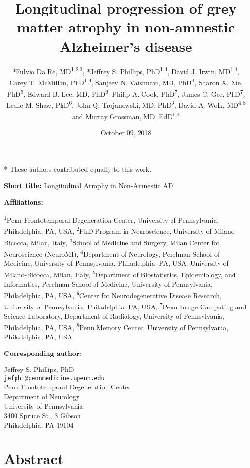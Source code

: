 \documentclass[]{article}
\title{Longitudinal progression of grey matter atrophy in non-amnestic
Alzheimer's disease}
\author{*Fulvio Da Re, MD\textsuperscript{1,2,3}, *Jeffrey S. Phillips,
PhD\textsuperscript{1,4}, David J. Irwin, MD\textsuperscript{1,4}, Corey
T. McMillan, PhD\textsuperscript{1,4}, Sanjeev N. Vaishnavi, MD,
PhD\textsuperscript{4}, Sharon X. Xie, PhD\textsuperscript{5}, Edward B.
Lee, MD, PhD\textsuperscript{6}, Philip A. Cook, PhD\textsuperscript{7},
James C. Gee, PhD\textsuperscript{7}, Leslie M. Shaw,
PhD\textsuperscript{6}, John Q. Trojanowski, MD, PhD\textsuperscript{6},
David A. Wolk, MD\textsuperscript{4,8} and Murray Grossman, MD,
EdD\textsuperscript{1,4}}
\date{October 09, 2018}
\begin{document}
\maketitle


* These authors contributed equally to this work.

\textbf{Short title:} Longitudinal Atrophy in Non-Amnestic AD

\textbf{Affiliations:}

\textsuperscript{1}Penn Frontotemporal Degeneration Center, University
of Pennsylvania, Philadelphia, PA, USA, \textsuperscript{2}PhD Program
in Neuroscience, University of Milano-Bicocca, Milan, Italy,
\textsuperscript{3}School of Medicine and Surgery, Milan Center for
Neuroscience (NeuroMI), \textsuperscript{4}Department of Neurology,
Perelman School of Medicine, University of Pennsylvania, Philadelphia,
PA, USA, University of Milano-Bicocca, Milan, Italy,
\textsuperscript{5}Department of Biostatistics, Epidemiology, and
Informatics, Perelman School of Medicine, University of Pennsylvania,
Philadelphia, PA, USA, \textsuperscript{6}Center for Neurodegenerative
Disease Research, University of Pennsylvania, Philadelphia, PA, USA,
\textsuperscript{7}Penn Image Computing and Science Laboratory,
Department of Radiology, University of Pennsylvania, Philadelphia, PA,
USA, \textsuperscript{8}Penn Memory Center, University of Pennsylvania,
Philadelphia, PA, USA

\textbf{Corresponding author:}

Jeffrey S. Phillips, PhD\\
\href{mailto:jefphi@pennmedicine.upenn.edu}{\nolinkurl{jefphi@pennmedicine.upenn.edu}}\\
Penn Frontotemporal Degeneration Center\\
Department of Neurology\\
University of Pennsylvania\\
3400 Spruce St., 3 Gibson\\
Philadelphia, PA 19104

\newpage


\section*{Abstract}\label{abstract}
\end{document}
